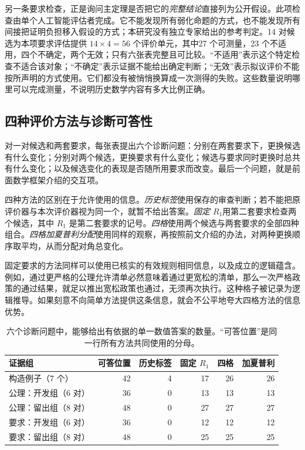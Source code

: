 另一条要求检查，正是询问主定理是否把它的\emph{完整结论}直接列为公开假设。此项检查由单个人工智能评估者完成。它不能发现所有弱化命题的方式，也不能发现所有间接把证明负担移入假设的方式；本研究没有独立专家给出的参考判定。14 对候选为本项要求评估提供 $14\times4=56$ 个评价单元，其中27 个可测量，23 个不适用，四个不确定，两个无效；只有六张表完整且可比较。“不适用”表示这个特定检查不适合该对象；“不确定”表示证据不能给出确定判断；“无效”表示拟议评价不能按所声明的方式使用。它们都没有被悄悄换算成一次测得的失败。这些数量说明哪里可以完成测量，不说明历史数学内容有多大比例正确。

\subsection{四种评价方法与诊断可答性}
\label{subsec:diagnostics}
对一对候选和两套要求，每张表提出六个诊断问题：分别在两套要求下，更换候选有什么变化；分别对两个候选，更换要求有什么变化；候选与要求同时更换时总共有什么变化；以及候选变化的表现是否随所用要求而改变。最后一个问题，就是前面数学框架介绍的交互项。

四种方法的区别在于允许使用的信息。\emph{历史标签}使用保存的审查判断；若不能把原评价器与本次评价器视为同一个，就暂不给出答案。\emph{固定 $R_1$}用第二套要求检查两个候选，其中 $R_1$ 是第二套要求的记号。\emph{四格}使用两个候选与两套要求的全部四种组合。\emph{四格加夏普利分配}使用同样的观察，再按照前文介绍的办法，对两种更换顺序取平均，从而分配对角总变化。

固定要求的方法同样可以使用已核实的有效规则相同信息，以及成立的逻辑蕴含。例如，通过更严格的公理允许清单必然意味着通过更宽松的清单，那么一次严格政策的通过结果，就足以推出宽松政策也通过，无须再次执行。这种格子被记录为逻辑推导。如果刻意不向简单方法提供这条信息，就会不公平地夸大四格方法的信息优势。

\begin{table}[htbp]
\centering\small
\caption{六个诊断问题中，能够给出有依据的单一数值答案的数量。“可答位置”是同一行所有方法共同使用的分母。}
\label{tab:availability}
\begin{tabularx}{\linewidth}{Y r r r r r}
\toprule
证据组 & 可答位置 & 历史标签 & 固定 $R_1$ & 四格 & 加夏普利 \\
\midrule
构造例子（7 个） & 42 & 4 & 17 & 26 & 26 \\
公理：开发组（6 对） & 36 & 0 & 13 & 13 & 13 \\
公理：留出组（8 对） & 48 & 0 & 27 & 27 & 27 \\
要求：开发组（6 对） & 36 & 0 & 12 & 12 & 12 \\
要求：留出组（8 对） & 48 & 0 & 25 & 25 & 25 \\
\bottomrule
\end{tabularx}
\end{table}

